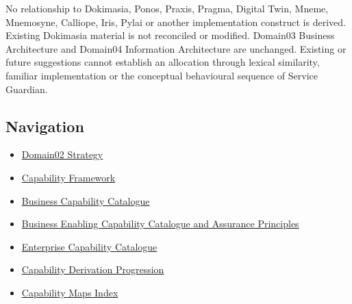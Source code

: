 No relationship to Dokimasia, Ponos, Praxis, Pragma, Digital Twin, Mneme, Mnemosyne, Calliope, Iris, Pylai or another implementation construct is derived. Existing Dokimasia material is not reconciled or modified. Domain03 Business Architecture and Domain04 Information Architecture are unchanged. Existing or future suggestions cannot establish an allocation through lexical similarity, familiar implementation or the conceptual behavioural sequence of Service Guardian.

\label{rad:assurance-strategy:102}
\subsection*{Navigation}
\label{rad:assurance-strategy:104}

\begin{itemize}

\item
\href{https://github.com/fhirfactory/harmonia/blob/98410db60155198a75f74c79d98060070209faa1/docs/markdown/02-strategy/README.md}{Domain02 Strategy}



\item
\href{https://github.com/fhirfactory/harmonia/blob/98410db60155198a75f74c79d98060070209faa1/docs/markdown/02-strategy/capabilities/index.md}{Capability Framework}



\item
\hyperref[rad:business]{Business Capability Catalogue}



\item
\hyperref[rad:enabling:674]{Business Enabling Capability Catalogue and Assurance Principles}



\item
\hyperref[rad:enterprise]{Enterprise Capability Catalogue}



\item
\hyperref[rad:tier-model]{Capability Derivation Progression}



\item
\href{https://github.com/fhirfactory/harmonia/blob/98410db60155198a75f74c79d98060070209faa1/docs/markdown/02-strategy/capability-maps/index.md}{Capability Maps Index}



\end{itemize}
